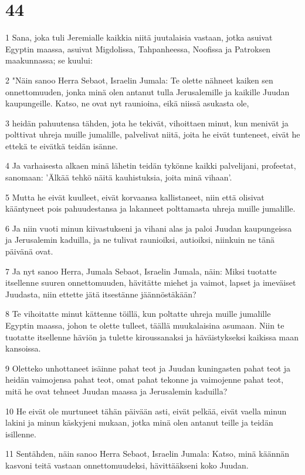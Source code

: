 \chapter{44}

\par 1 Sana, joka tuli Jeremialle kaikkia niitä juutalaisia vastaan, jotka asuivat Egyptin maassa, asuivat Migdolissa, Tahpanheessa, Noofissa ja Patroksen maakunnassa; se kuului:
\par 2 "Näin sanoo Herra Sebaot, Israelin Jumala: Te olette nähneet kaiken sen onnettomuuden, jonka minä olen antanut tulla Jerusalemille ja kaikille Juudan kaupungeille. Katso, ne ovat nyt raunioina, eikä niissä asukasta ole,
\par 3 heidän pahuutensa tähden, jota he tekivät, vihoittaen minut, kun menivät ja polttivat uhreja muille jumalille, palvelivat niitä, joita he eivät tunteneet, eivät he ettekä te eivätkä teidän isänne.
\par 4 Ja varhaisesta alkaen minä lähetin teidän tykönne kaikki palvelijani, profeetat, sanomaan: 'Älkää tehkö näitä kauhistuksia, joita minä vihaan'.
\par 5 Mutta he eivät kuulleet, eivät korvaansa kallistaneet, niin että olisivat kääntyneet pois pahuudestansa ja lakanneet polttamasta uhreja muille jumalille.
\par 6 Ja niin vuoti minun kiivastukseni ja vihani alas ja paloi Juudan kaupungeissa ja Jerusalemin kaduilla, ja ne tulivat raunioiksi, autioiksi, niinkuin ne tänä päivänä ovat.
\par 7 Ja nyt sanoo Herra, Jumala Sebaot, Israelin Jumala, näin: Miksi tuotatte itsellenne suuren onnettomuuden, hävitätte miehet ja vaimot, lapset ja imeväiset Juudasta, niin ettette jätä itsestänne jäännöstäkään?
\par 8 Te vihoitatte minut kättenne töillä, kun poltatte uhreja muille jumalille Egyptin maassa, johon te olette tulleet, täällä muukalaisina asumaan. Niin te tuotatte itsellenne häviön ja tulette kiroussanaksi ja häväistykseksi kaikissa maan kansoissa.
\par 9 Oletteko unhottaneet isäinne pahat teot ja Juudan kuningasten pahat teot ja heidän vaimojensa pahat teot, omat pahat tekonne ja vaimojenne pahat teot, mitä he ovat tehneet Juudan maassa ja Jerusalemin kaduilla?
\par 10 He eivät ole murtuneet tähän päivään asti, eivät pelkää, eivät vaella minun lakini ja minun käskyjeni mukaan, jotka minä olen antanut teille ja teidän isillenne.
\par 11 Sentähden, näin sanoo Herra Sebaot, Israelin Jumala: Katso, minä käännän kasvoni teitä vastaan onnettomuudeksi, hävittääkseni koko Juudan.
